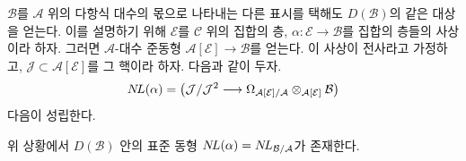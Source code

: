 \medskip\noindent
$\mathcal{B}$를 $\mathcal{A}$ 위의 다항식 대수의 몫으로 나타내는 다른
표시를 택해도 $D(\mathcal{B})$의 같은 대상을 얻는다. 이를 설명하기 위해
$\mathcal{E}$를 $\mathcal{C}$ 위의 집합의 층,
$\alpha : \mathcal{E} \to \mathcal{B}$를 집합의 층들의 사상이라 하자.
그러면 $\mathcal{A}$-대수 준동형
$\mathcal{A}[\mathcal{E}] \to \mathcal{B}$를 얻는다. 이 사상이 전사라고
가정하고, $\mathcal{J} \subset \mathcal{A}[\mathcal{E}]$를 그 핵이라 하자.
다음과 같이 두자.
$$
\mathop{N\!L}\nolimits(\alpha) = \left(
\mathcal{J}/\mathcal{J}^2
\longrightarrow
\Omega_{\mathcal{A}[\mathcal{E}]/\mathcal{A}}
\otimes_{\mathcal{A}[\mathcal{E}]} \mathcal{B}\right)
$$
다음이 성립한다.

\begin{lemma}
\label{lemma-NL-up-to-qis}
위 상황에서 $D(\mathcal{B})$ 안의 표준 동형
$\mathop{N\!L}\nolimits(\alpha) = \mathop{N\!L}\nolimits_{\mathcal{B}/\mathcal{A}}$가 존재한다.
\end{lemma}

